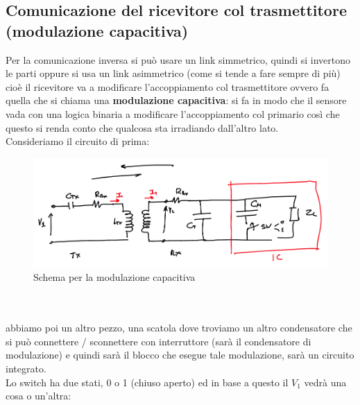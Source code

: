 \documentclass[oneside, 12pt]{extbook}
\begin{document}
\subsection{Comunicazione del ricevitore col trasmettitore (modulazione capacitiva)}
Per la comunicazione inversa si può usare un link simmetrico, quindi si invertono le parti oppure si usa un link asimmetrico (come si tende a fare sempre di più) cioè il ricevitore va a modificare l'accoppiamento col trasmettitore ovvero fa quella che si chiama una \textbf{modulazione capacitiva}: si fa in modo che il sensore vada con una logica binaria a modificare l'accoppiamento col primario così che questo si renda conto che qualcosa sta irradiando dall'altro lato.\\Consideriamo il circuito di prima:\\
\begin{figure}[!h]
	\includegraphics[scale=0.5]{immagini/schema_mod_cap.png}
	\caption{Schema per la modulazione capacitiva}
\end{figure}
\\\\
abbiamo poi un altro pezzo, una scatola dove troviamo un altro condensatore che si può connettere / sconnettere con interruttore (sarà il condensatore di modulazione) e quindi sarà il blocco che esegue tale modulazione, sarà un circuito integrato.\\Lo switch ha due stati, 0 o 1 (chiuso aperto) ed in base a questo il $V_1$ vedrà una cosa o un'altra:
\end{document}
